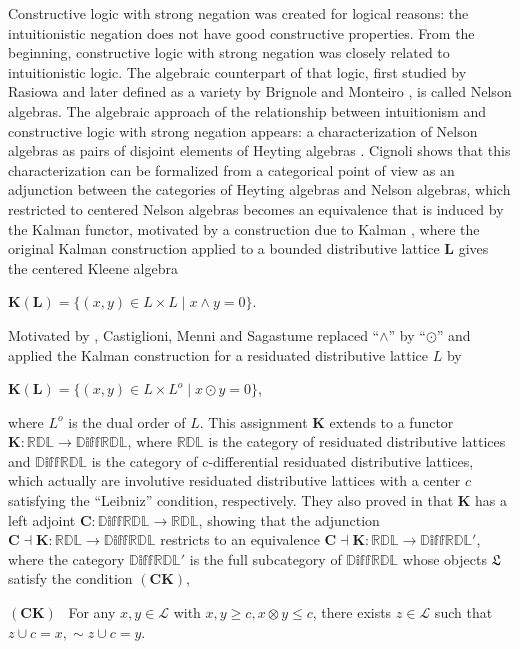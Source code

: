 \documentclass[final,12pt,times]{elsarticle}
\theoremstyle{plain}
\theoremstyle{definition}
\theoremstyle{break}
\begin{document}
Constructive logic with strong negation \cite{Rasiowa} was created for logical reasons: the
intuitionistic negation does not have good constructive properties. From the beginning, constructive logic with strong negation was closely related to intuitionistic logic. The algebraic counterpart of that logic, first studied by Rasiowa and later defined as a variety by Brignole and Monteiro \cite{Brignolea,Brignoleb}, is called Nelson algebras.  The algebraic approach of the relationship between intuitionism and constructive
logic with strong negation appears: a characterization of Nelson algebras as pairs of disjoint elements of Heyting algebras \cite{Vakarelov}. Cignoli \cite{Cignoli} shows that this characterization can be formalized from a categorical point of view as an adjunction between the categories of Heyting algebras and Nelson algebras, which restricted to centered Nelson algebras becomes an equivalence that is induced by the Kalman functor, motivated by a construction due to Kalman \cite{Kalman}, where the original Kalman construction applied to a bounded distributive lattice $\mathbf{L}$ gives the centered Kleene algebra \begin{center} $\mathbf{K}(\mathbf{L})=\{(x,y)\in L\times L \mid x\wedge y=0\}$.
\end{center} Motivated by \cite{Cignoli},  Castiglioni, Menni and Sagastume \cite {Castiglionib} replaced “$\wedge$” by “$\odot$” and applied the Kalman construction for a residuated distributive lattice $L$ by 
\begin{center} $\mathbf{K}(\mathbf{L})=\{(x,y)\in L\times L^o \mid x\odot y=0\}$,
\end{center} where $L^o$ is the dual order of $L$. This assignment $\mathbf{K}$ extends to a functor $\mathbf{K}:\mathbb{RDL}\rightarrow \mathbb{D\text{iff}RDL}$, where $\mathbb{RDL}$ is the category of residuated distributive lattices and $\mathbb{D\text{iff}RDL}$ is the category  of c-differential residuated distributive lattices, which actually are involutive residuated distributive lattices with a center $c$ satisfying the ``Leibniz'' condition, respectively. They also proved in \cite{Cignoli} that $\mathbf{K}$ has a left adjoint $\mathbf{C}:\mathbb{D\text{iff}RDL}\rightarrow \mathbb{RDL}$, showing that the adjunction $\mathbf{C}\dashv \mathbf{K}:\mathbb{RDL}\rightarrow \mathbb{D\text{iff}RDL}$ restricts to an equivalence $\mathbf{C}\dashv \mathbf{K}:\mathbb{RDL}\rightarrow \mathbb{D\text{iff}RDL'}$, where the category $\mathbb{D\text{iff}RDL'}$ is the full subcategory of $\mathbb{D\text{iff}RDL}$ whose objects $\boldsymbol{\mathfrak{L}}$ satisfy the condition $(\mathbf{CK})$, 
\begin{center}$(\mathbf{CK})$~ For any $x,y\in\mathcal{L}$ with $x,y\geq c,x\otimes y\leq c$, there exists $z\in \mathcal{L}$ such that $z\cup c=x,{\sim}z\cup c=y$.
\end{center} 
\end{document}

